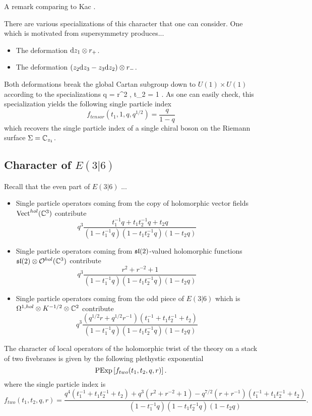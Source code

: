 \documentclass[11pt]{amsart}
\begin{document}
A remark comparing to Kac \cite{KR1}. 

\parsec

There are various specializations of this character that one can consider. 
One which is motivated from supersymmetry produces...

\begin{itemize}
\item The deformation ${\rm d} z_1 \otimes r_+$.
\item The deformation $(z_2 {\rm d} z_3 - z_3 {\rm d} z_2) \otimes r_-$. 
\end{itemize}

Both deformations break the global Cartan subgroup down to $U(1) \times U(1)$ according to the specializations
\beqn\label{eqn:special1}
q = r^2 , \quad t_2 = 1 .
\eeqn
As one can easily check, this specialization yields the following single particle index
\[
f_{tensor}(t_1, 1, q, q^{1/2}) = \frac{q}{1-q} 
\]
which recovers the single particle index of a single chiral boson on the Riemann surface $\Sigma = \mathbb{C}_{z_1}$. 

\subsection{Character of $E(3|6)$}

\parsec[]

Recall that the even part of $E(3|6)$ ... 

\begin{itemize}
\item Single particle operators coming from the copy of holomorphic vector fields ${\rm Vect}^{hol}(\mathbb{C}^3)$ contribute
\[
q^3 \frac{t_1^{-1} q + t_1 t_2^{-1} q + t_2 q }{(1-t_1^{-1}q) (1-t_1 t_2^{-1} q) (1-t_2 q)} 
\]
\item Single particle operators coming from $\mathfrak{sl}(2)$-valued holomorphic functions $\mathfrak{sl}(2) \otimes \mathcal O^{hol}(\mathbb{C}^3)$ contribute
\[
q^3\frac{r^2 + r^{-2} + 1}{(1-t_1^{-1}q) (1-t_1 t_2^{-1} q) (1-t_2 q)} 
\]
\item Single particle operators coming from the odd piece of $E(3|6)$ which is $\Omega^{1,hol} \otimes K^{-1/2} \otimes \mathbb{C}^2$ contribute
\[
q^{3}\frac{(q^{1/2} r + q^{1/2} r^{-1})(t_1^{-1} + t_1t_2^{-1} + t_2)}{(1-t_1^{-1}q) (1-t_1 t_2^{-1} q) (1-t_2 q)}
\]
\end{itemize}

\begin{conj}
The character of local operators of the holomorphic twist of the theory on a stack of two fivebranes is given by the following plethystic exponential
\[
{\rm PExp} \left[f_{two} (t_1,t_2,q,r) \right] .
\]
where the single particle index is
\[
f_{two} (t_1,t_2,q,r) = \frac{q^4(t_1^{-1} + t_1 t_2^{-1}  + t_2) + q^3 (r^2 + r^{-2} + 1) - q^{7/2} (r + r^{-1})(t_1^{-1} + t_1t_2^{-1} + t_2)}{(1-t_1^{-1}q) (1-t_1 t_2^{-1} q) (1-t_2 q)} .
\]
\end{conj}
\end{document}
